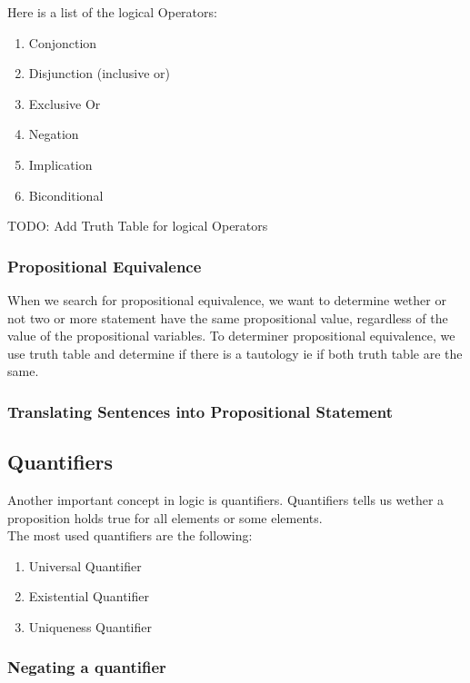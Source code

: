 \documentclass{article}
\begin{document}
Here is a list of the logical Operators:

\begin{enumerate}
    \item Conjonction
    \item Disjunction (inclusive or)
    \item Exclusive Or
    \item Negation
    \item Implication
    \item Biconditional
\end{enumerate}

TODO: Add Truth Table for logical Operators

\subsubsection{Propositional Equivalence}

When we search for propositional equivalence, we want to determine wether or not
two or more statement have the same propositional value, regardless of the value
of the propositional variables. To determiner propositional equivalence, we use
truth table and determine if there is a tautology ie if both truth table are the
same.

\subsubsection{Translating Sentences into Propositional Statement}

\subsection{Quantifiers}

Another important concept in logic is quantifiers. Quantifiers tells us wether
a proposition holds true for all elements or some elements.\\

The most used quantifiers are the following:

    \begin{enumerate}
	\item Universal Quantifier
	\item Existential Quantifier
	\item Uniqueness Quantifier
    \end{enumerate}

\subsubsection{Negating a quantifier}
\end{document}

